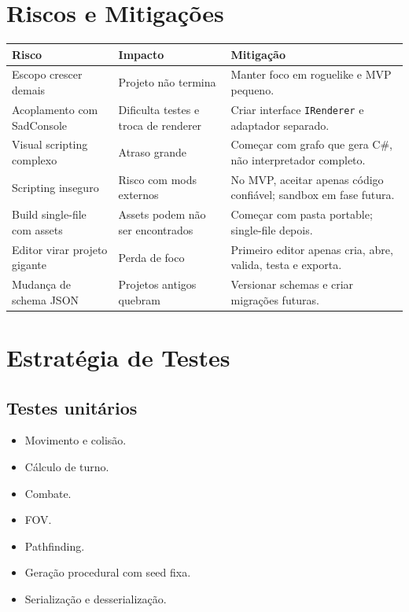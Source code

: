 \documentclass[12pt,a4paper]{article}
\begin{document}
\section{Riscos e Mitigações}

\begin{longtable}{p{4.2cm}p{4.8cm}p{5.1cm}}
\toprule
\textbf{Risco} & \textbf{Impacto} & \textbf{Mitigação} \\
\midrule
Escopo crescer demais & Projeto não termina & Manter foco em roguelike e MVP pequeno. \\
Acoplamento com SadConsole & Dificulta testes e troca de renderer & Criar interface \texttt{IRenderer} e adaptador separado. \\
Visual scripting complexo & Atraso grande & Começar com grafo que gera C\#, não interpretador completo. \\
Scripting inseguro & Risco com mods externos & No MVP, aceitar apenas código confiável; sandbox em fase futura. \\
Build single-file com assets & Assets podem não ser encontrados & Começar com pasta portable; single-file depois. \\
Editor virar projeto gigante & Perda de foco & Primeiro editor apenas cria, abre, valida, testa e exporta. \\
Mudança de schema JSON & Projetos antigos quebram & Versionar schemas e criar migrações futuras. \\
\bottomrule
\end{longtable}

\section{Estratégia de Testes}

\subsection{Testes unitários}

\begin{itemize}
    \item Movimento e colisão.
    \item Cálculo de turno.
    \item Combate.
    \item FOV.
    \item Pathfinding.
    \item Geração procedural com seed fixa.
    \item Serialização e desserialização.
\end{itemize}
\end{document}
